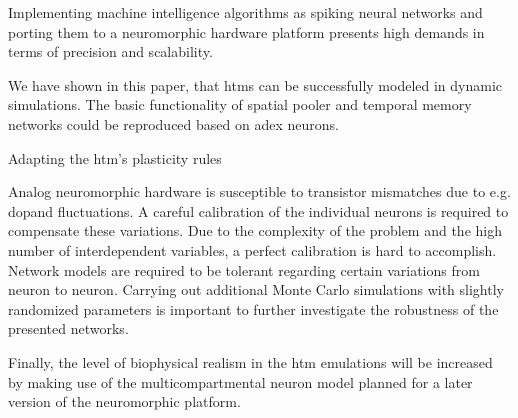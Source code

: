 Implementing machine intelligence algorithms as spiking neural networks and porting them to a neuromorphic hardware platform presents high demands in terms of precision and scalability.

We have shown in this paper, that \glspl{htm} can be successfully modeled in dynamic simulations. The basic functionality of spatial pooler and temporal memory networks could be reproduced based on \gls{adex} neurons.

Adapting the \gls{htm}'s plasticity rules

Analog neuromorphic hardware is susceptible to transistor mismatches due to e.g. dopand fluctuations. A careful calibration of the individual neurons is required to compensate these variations. Due to the complexity of the problem and the high number of interdependent variables, a perfect calibration is hard to accomplish. Network models are required to be tolerant regarding certain variations from neuron to neuron. Carrying out additional Monte Carlo simulations with slightly randomized parameters is important to further investigate the robustness of the presented networks.

Finally, the level of biophysical realism in the \gls{htm} emulations will be increased by making use of the multicompartmental neuron model planned for a later version of the neuromorphic platform.
